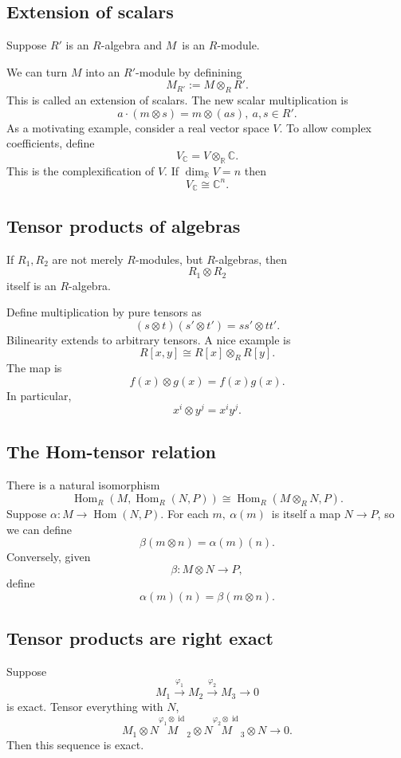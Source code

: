 \documentclass[11pt]{article}
\begin{document}
\subsection{Extension of scalars}
Suppose $R'$ is an $R$-algebra and $M$ is an 
$R$-module. 

We can turn $M$ into an $R'$-module by definining 
\[
    M_{R'} := M \otimes_R R'. 
\]
This is called an extension of scalars. 
The new scalar multiplication is 
\[
    a \cdot (m \otimes s) = m \otimes (as), \ 
    a,s \in R'. 
\]
As a motivating example, consider a real vector space $V$. 
To allow complex coefficients, define 
\[
    V_{\mathbb C} = V \otimes_{\mathbb R} \mathbb C. 
\]
This is the complexification of $V$. 
If $\dim_{\mathbb R}V = n$ then 
\[
    V_{\mathbb C} \cong \mathbb C^n. 
\]

\subsection{Tensor products of algebras}
If $R_1,R_2$ are not merely $R$-modules, but $R$-algebras, 
then 
\[
    R_1 \otimes R_2
\]
itself is an $R$-algebra. 

Define multiplication by pure tensors as 
\[
    (s \otimes t)(s'\otimes t') = ss' \otimes tt'. 
\]
Bilinearity extends to arbitrary tensors. 
A nice example is 
\[
    R[x,y] \cong R[x] \otimes_R R[y]. 
\]
The map is 
\[
    f(x)\otimes g(x) = f(x)g(x). 
\]
In particular, 
\[
    x^i \otimes y^j = x^iy^j. 
\]

\subsection{The Hom-tensor relation}
There is a natural isomorphism 
\[
    \operatorname{Hom}_R(M,\operatorname{Hom}_R(N,P)) 
    \cong \operatorname{Hom}_R(M \otimes_R N, P). 
\]
Suppose $\alpha : M \to \operatorname{Hom}(N,P)$. 
For each $m, \ \alpha(m)$ is itself a map $N \to P$, so we 
can define 
\[
    \beta(m\otimes n) = \alpha(m)(n). 
\]
Conversely, given 
\[
    \beta : M \otimes N \to P,
\]
define 
\[
    \alpha(m)(n) = \beta(m\otimes n). 
\]

\subsection{Tensor products are right exact}
Suppose 
\[
    M_1 \overset{\varphi_1}\to M_2 
    \overset{\varphi_2}\to M_3 \to 0
\]
is exact. 
Tensor everything with $N$, 
\[
    M_1 \otimes N 
    \overset{\varphi_1 \otimes \operatorname{id}} M_2 \otimes N 
    \overset{\varphi_2 \otimes \operatorname{id}} M_3 \otimes N \to 0. 
\]
Then this sequence is exact. 
\end{document}
